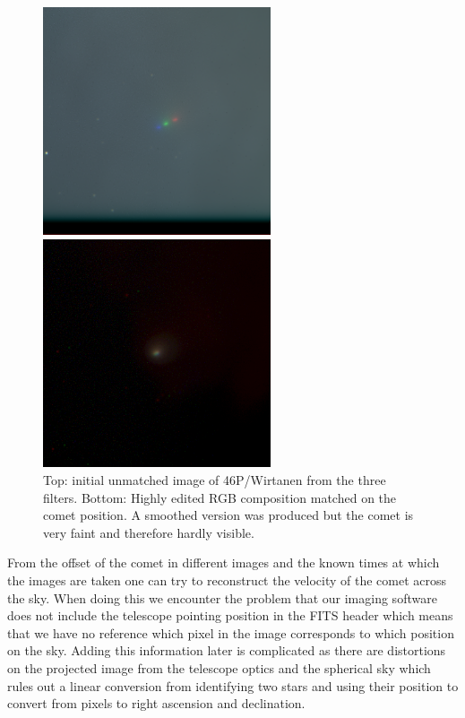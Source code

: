 \documentclass{article}
\begin{document}
\begin{figure}[H]
    \centering
    \begin{minipage}{1.\textwidth}
        \centering
       \includegraphics[width=0.6\textwidth]{Comet/RGB_comet_unmatched.png}
    \end{minipage}
       \begin{minipage}{1.\textwidth}
       \centering
       \includegraphics[width=0.6\textwidth]{Comet/comet_rgb_snow.png}
    \end{minipage}

 
    \caption{Top: initial unmatched image of 46P/Wirtanen from the three filters. Bottom: Highly edited RGB composition matched on the comet position. A smoothed version was produced but the comet is very faint and therefore hardly visible.}
    \label{fig:wirtanen_start}
\end{figure}

From the offset of the comet in different images and the known times at which the images are taken one can try to reconstruct the velocity of the comet across the sky. When doing this we encounter the problem that our imaging software does not include the telescope pointing position in the FITS header which means that we have no reference which pixel in the image corresponds to which position on the sky. Adding this information later is complicated as there are distortions on the projected image from the telescope optics and the spherical sky which rules out a linear conversion from identifying two stars and using their position to convert from pixels to right ascension and declination. 
\end{document}
